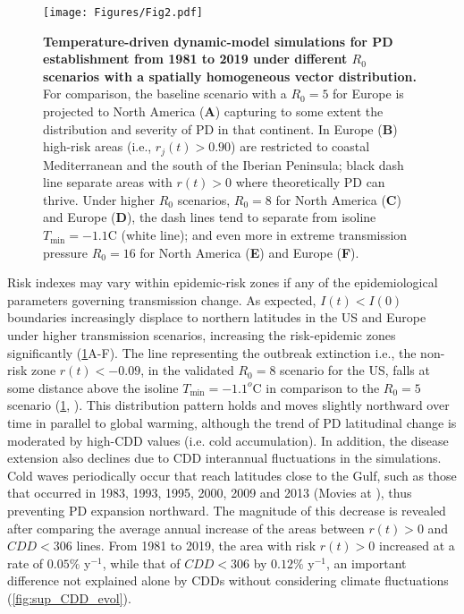     \begin{figure}[H]
        \centering
        \texttt{[image: Figures/Fig2.pdf]}
        \caption{\textbf{Temperature-driven dynamic-model simulations  for PD
                establishment from 1981 to 2019 under different $R_0$ scenarios
                with a
                spatially homogeneous vector distribution.} For comparison, the
            baseline
            scenario with a $R_0=5$ for Europe is projected to North America
            (\textbf{A})
            capturing to some extent the distribution and severity of PD in
            that continent.
            In Europe (\textbf{B}) high-risk areas (i.e., $r_j(t) > 0.90$) are
            restricted
            to coastal Mediterranean and the south of the Iberian Peninsula;
            black dash
            line separate areas with $r(t)>0$ where theoretically PD can
            thrive. Under
            higher $R_0$ scenarios, $R_0=8$ for North America (\textbf{C}) and
            Europe
            (\textbf{D}), the dash lines tend to separate from isoline
            $T_{\textrm{min}} =
                -1.1$\textdegree C (white line); and even more in extreme
            transmission pressure
            $R_0=16$ for North America (\textbf{E}) and Europe (\textbf{F}). }
        \label{fig4}
    \end{figure}

    Risk indexes may vary within epidemic-risk zones if any of the
    epidemiological
    parameters governing transmission change. As expected, $I(t) < I(0)$
    boundaries
    increasingly displace to northern latitudes in the US and Europe under
    higher
    transmission scenarios, increasing the risk-epidemic zones significantly
    (\cref{fig4}A-F). The line representing the outbreak extinction i.e., the
    non-risk zone $r(t)<-0.09$, in the validated $R_0=8$ scenario for the US,
    falls
    at some distance above the isoline $T_{\textrm{min}} = -1.1^o$C in
    comparison
    to the $R_0=5$ scenario (\cref{fig4}, \cite{Webpage}). This distribution
    pattern holds and moves slightly northward over
    time
    in parallel to global warming, although the trend of PD latitudinal change
    is
    moderated by high-CDD values (i.e. cold accumulation). In addition, the
    disease
    extension also declines due to CDD interannual fluctuations in the
    simulations.
    Cold waves periodically occur that reach latitudes close to the Gulf, such
    as
    those that occurred in 1983, 1993, 1995, 2000, 2009 and 2013 (Movies at
    \cite{Webpage}), thus preventing PD expansion northward. The magnitude of
    this
    decrease is revealed after comparing the average annual increase of the
    areas
    between $r(t) > 0$ and $CDD < 306$ lines. From 1981 to 2019, the area with
    risk
$r(t) > 0$ increased at a rate of $0.05\%$ y$^{-1}$, while that of $CDD < 306$
    by $0.12\%$ y$^{-1}$, an important difference not explained alone by CDDs
    without considering climate fluctuations (\cref{fig:sup_CDD_evol}).

